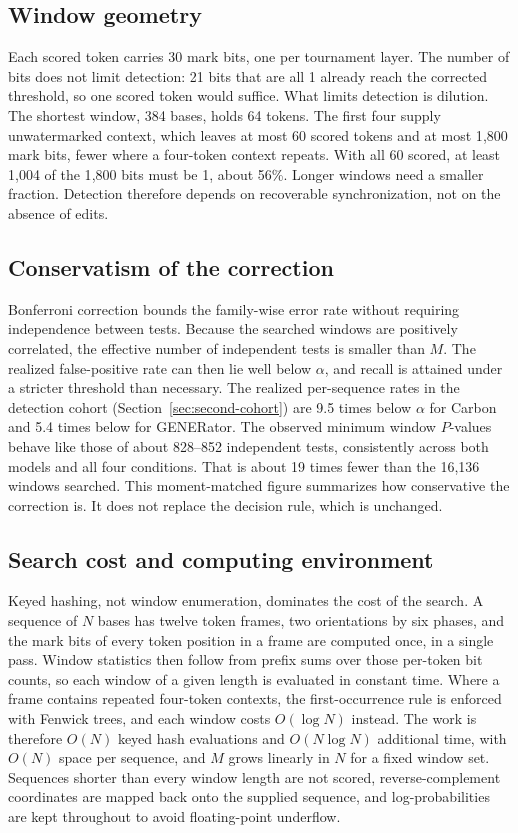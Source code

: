 \documentclass[10pt,twocolumn]{article}
\begin{document}
\subsection{Window geometry}
\label{supp:geometry}

Each scored token carries 30 mark bits, one per tournament layer. The number of bits does not
limit detection: 21 bits that are all 1 already reach the corrected threshold, so one scored token
would suffice. What limits detection is dilution. The shortest window, 384 bases, holds 64 tokens.
The first four supply unwatermarked context, which leaves at most 60 scored tokens and at most
1{,}800 mark bits, fewer where a four-token context repeats. With all 60 scored, at least 1{,}004 of
the 1{,}800 bits must be 1, about 56\%. Longer windows need a smaller fraction. Detection therefore
depends on recoverable synchronization, not on the absence of edits.

\subsection{Conservatism of the correction}
\label{supp:bonferroni}

Bonferroni correction bounds the family-wise error rate without requiring independence between
tests. Because the searched windows are positively correlated, the effective number of independent
tests is smaller than $M$. The realized false-positive rate can then lie well below $\alpha$, and
recall is attained under a stricter threshold than necessary. The realized per-sequence rates in the
detection cohort (Section~\ref{sec:second-cohort}) are 9.5 times below $\alpha$ for Carbon and 5.4
times below for GENERator. The observed minimum window $P$-values behave like those of about
828--852 independent tests, consistently across both models and all four conditions. That is about
19 times fewer than the 16{,}136 windows searched. This moment-matched figure summarizes how
conservative the correction is. It does not replace the decision rule, which is unchanged.

\subsection{Search cost and computing environment}
\label{supp:cost}

Keyed hashing, not window enumeration, dominates the cost of the search. A sequence of $N$ bases has
twelve token frames, two orientations by six phases, and the mark bits of every token position in
a frame are computed once, in a single pass. Window statistics then follow from prefix sums over
those per-token bit counts, so each window of a given length is evaluated in constant time. Where a
frame contains repeated four-token contexts, the first-occurrence rule is enforced with Fenwick
trees, and each window costs $O(\log N)$ instead. The work is therefore $O(N)$ keyed hash
evaluations and $O(N \log N)$ additional time, with $O(N)$ space per sequence, and $M$ grows linearly in
$N$ for a fixed window set. Sequences shorter than every window length are not scored,
reverse-complement coordinates are mapped back onto the supplied sequence, and log-probabilities are
kept throughout to avoid floating-point underflow.
\end{document}
